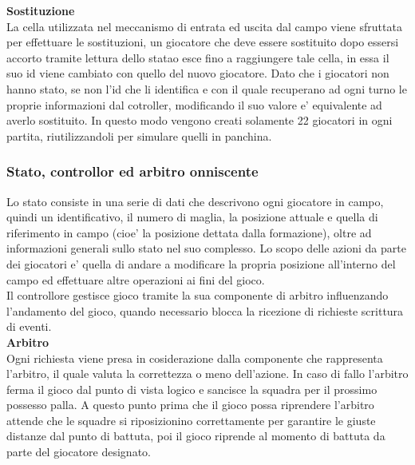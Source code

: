 \textbf{Sostituzione}\\

La cella utilizzata nel meccanismo di entrata ed uscita dal campo viene sfruttata per effettuare le sostituzioni, un giocatore che deve essere sostituito dopo essersi accorto tramite lettura dello statao esce fino a raggiungere tale cella, in essa il suo id viene cambiato con quello del nuovo giocatore. Dato che i giocatori non hanno stato, se non l'id che li identifica e con il quale recuperano ad ogni turno le proprie informazioni dal cotroller, modificando il suo valore e' equivalente ad averlo sostituito. In questo modo vengono creati solamente 22 giocatori in ogni partita, riutilizzandoli per simulare quelli in panchina.\\

\subsubsection{Stato, controllor ed arbitro onniscente}
\label{sec:analisi_concorrenza_controller_arbitro}

Lo stato consiste in una serie di dati che descrivono ogni giocatore in campo, quindi un identificativo, il numero di maglia, la posizione attuale e quella di riferimento in campo (cioe' la posizione dettata dalla formazione), oltre ad informazioni generali sullo stato nel suo complesso. Lo scopo delle azioni da parte dei giocatori e' quella di andare a modificare la propria posizione all'interno del campo ed effettuare altre operazioni ai fini del gioco.\\

Il controllore gestisce gioco tramite la sua componente di arbitro influenzando l'andamento  del gioco, quando necessario blocca la ricezione di richieste scrittura di eventi.\\

\textbf{Arbitro}\\

Ogni richiesta viene presa in cosiderazione dalla componente che rappresenta l'arbitro, il quale valuta la correttezza o meno dell'azione. In caso di fallo l'arbitro ferma il gioco dal punto di vista logico e sancisce la squadra per il prossimo possesso palla. A questo punto prima che il gioco possa riprendere l'arbitro attende che le squadre si riposizionino correttamente per garantire le giuste distanze dal punto di battuta, poi il gioco riprende al momento di battuta da parte del giocatore designato.\\

